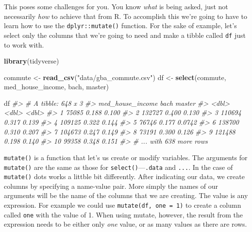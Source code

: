 \documentclass[
]{book}
\newenvironment{Shaded}{\begin{snugshade}}{\end{snugshade}}
\newcommand{\CommentTok}[1]{\textcolor[rgb]{0.56,0.35,0.01}{\textit{#1}}}
\newcommand{\KeywordTok}[1]{\textcolor[rgb]{0.13,0.29,0.53}{\textbf{#1}}}
\newcommand{\NormalTok}[1]{#1}
\newcommand{\StringTok}[1]{\textcolor[rgb]{0.31,0.60,0.02}{#1}}
\begin{document}
This poses some challenges for you. You know \emph{what} is being asked, just not necessarily \emph{how} to achieve that from R. To accomplish this we're going to have to learn how to use the \texttt{dplyr::mutate()} function. For the sake of example, let's select only the columns that we're going to need and make a tibble called \texttt{df} just to work with.

\begin{Shaded}
\begin{Highlighting}[]
\KeywordTok{library}\NormalTok{(tidyverse)}

\NormalTok{commute \textless{}{-}}\StringTok{ }\KeywordTok{read\_csv}\NormalTok{(}\StringTok{"data/gba\_commute.csv"}\NormalTok{)}
\NormalTok{df \textless{}{-}}\StringTok{ }\KeywordTok{select}\NormalTok{(commute, med\_house\_income, bach, master)}

\NormalTok{df}
\CommentTok{\#\textgreater{} \# A tibble: 648 x 3}
\CommentTok{\#\textgreater{}    med\_house\_income  bach master}
\CommentTok{\#\textgreater{}               \textless{}dbl\textgreater{} \textless{}dbl\textgreater{}  \textless{}dbl\textgreater{}}
\CommentTok{\#\textgreater{}  1            75085 0.188 0.100 }
\CommentTok{\#\textgreater{}  2           132727 0.400 0.130 }
\CommentTok{\#\textgreater{}  3           110694 0.317 0.139 }
\CommentTok{\#\textgreater{}  4           109125 0.322 0.144 }
\CommentTok{\#\textgreater{}  5            76746 0.177 0.0742}
\CommentTok{\#\textgreater{}  6           138700 0.310 0.207 }
\CommentTok{\#\textgreater{}  7           104673 0.247 0.149 }
\CommentTok{\#\textgreater{}  8            73191 0.300 0.126 }
\CommentTok{\#\textgreater{}  9           121488 0.198 0.140 }
\CommentTok{\#\textgreater{} 10            99358 0.348 0.151 }
\CommentTok{\#\textgreater{} \# ... with 638 more rows}
\end{Highlighting}
\end{Shaded}

\texttt{mutate()} is a function that let's us create or modify variables. The arguments for \texttt{mutate()} are the same as those for \texttt{select()}---\texttt{.data} and \texttt{...}. In the case of \texttt{mutate()} dots works a littble bit differently. After indicating our data, we create columns by specifying a name-value pair. More simply the names of our arguments will be the name of the columns that we are creating. The value is any expression. For example we could use \texttt{mutate(df,\ one\ =\ 1)} to create a column called \texttt{one} with the value of 1. When using mutate, however, the result from the expression needs to be either only \emph{one} value, or as many values as there are rows.
\end{document}
